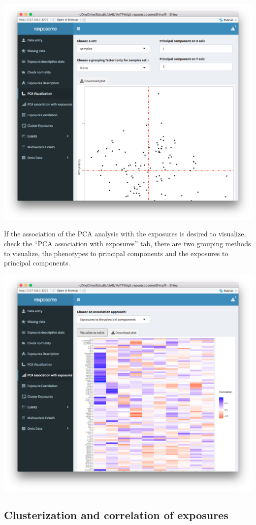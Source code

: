 \documentclass[
]{book}
\begin{document}
\includegraphics{images/analysis5_2.png}

If the association of the PCA analysis with the exposures is desired to visualize, check the ``PCA association with exposures'' tab, there are two grouping methods to visualize, the phenotypes to principal components and the exposures to principal components.

\includegraphics{images/analysis5_3.png}

\hypertarget{clusterization-and-correlation-of-exposures}{%
\subsection{Clusterization and correlation of exposures}\label{clusterization-and-correlation-of-exposures}}
\end{document}
